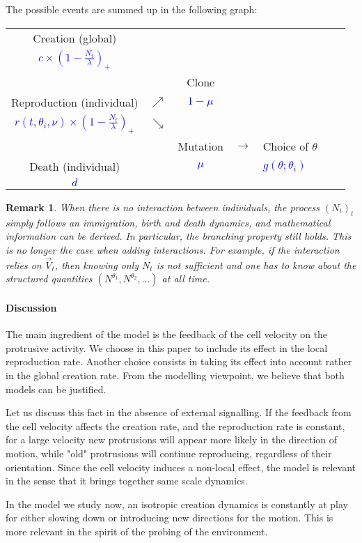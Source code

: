 \documentclass[a4paper,11pt]{article}
\newtheorem{remark}[theo]{Remark}
\begin{document}
The possible events are summed up in the following graph:

\begin{center}
\centering
\begin{tabular}{cccclll}
Creation (global) &&&&  \\
\textcolor{blue}{$c\times (1-\frac{N_t}{\lambda})_+$} &&&&\\
   & & Clone &  &  \\
Reproduction (individual) &  $\nearrow$ & \textcolor{blue}{$1-\mu$} & & \\
 \textcolor{blue}{$r(t,\theta_i, \nu)\times (1-\frac{N_t}{\lambda})_+$} &  $\searrow$ &&&  \\
 && Mutation&  $\longrightarrow$ & Choice of $\theta$ \\
Death (individual)&& \textcolor{blue}{$\mu$} &&\textcolor{blue}{$ g(\theta ; \theta_i)$}\\
\textcolor{blue}{$d$}&&&&
\end{tabular}
\end{center}


\begin{remark}
When there is no interaction between individuals, the process $(N_t)_t$ simply follows an immigration, birth and death dynamics, and mathematical information can be derived. In particular, the branching property still holds. This is no longer the case when adding interactions. For example, if the interaction relies on $\vec{V}_t$, then knowing only $N_t$ is not sufficient and one has to know about the structured quantities $(N^{\theta_1},N^{\theta_2},...)$ at all time.
\end{remark}


\paragraph{Discussion}
The main ingredient of the model is the feedback of the cell velocity on the protrusive activity. We choose in this paper to include its effect in the local reproduction rate. Another choice consists in taking its effect into account rather in the global creation rate. From the modelling viewpoint, we believe that both models can be justified. 



Let us discuss this fact in the absence of external signalling. 
If the feedback from the cell velocity affects the creation rate, and the reproduction rate is constant, for a large velocity new protrusions will appear more likely in the direction of motion, while "old" protrusions will continue reproducing, regardless of their orientation. Since the cell velocity induces a non-local effect, the model is relevant in the sense that it brings together same scale dynamics. \par 
In the model we study now, an isotropic creation dynamics is constantly at play for either slowing down or introducing new directions for the motion. This is more relevant in the spirit of the probing of the environment. 
\end{document}
